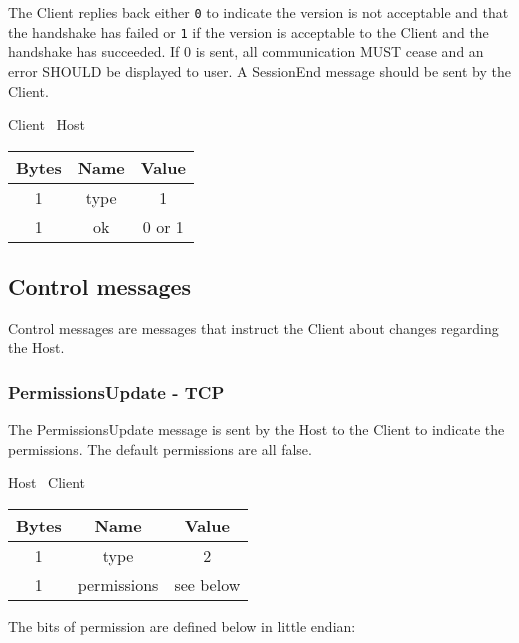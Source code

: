 The Client replies back either \texttt{0} to indicate the version is not acceptable and that the handshake has
failed or \texttt{1} if the version is acceptable to the Client and the handshake has succeeded.
If 0 is sent, all communication MUST cease and an error SHOULD be displayed to user.
A SessionEnd message should be sent by the Client.

\begin{center}
    Client \textrightarrow\ Host\\
    \begin{tabular}{|c|c|c|}
        \hline
        \textbf{Bytes} & \textbf{Name} & \textbf{Value} \\
        \hline
        1              & type          & 1              \\
        \hline
        1              & ok            & 0 or 1         \\
        \hline
    \end{tabular}
\end{center}

\subsection{Control messages}
Control messages are messages that instruct the Client about changes regarding the Host.

\subsubsection{PermissionsUpdate - TCP}

The PermissionsUpdate message is sent by the Host to the Client to indicate the permissions.
The default permissions are all false.

\begin{center}
    Host \textrightarrow\ Client\\
    \begin{tabular}{|c|c|c|}
        \hline
        \textbf{Bytes} & \textbf{Name} & \textbf{Value} \\
        \hline
        1              & type          & 2              \\
        \hline
        1              & permissions   & see below      \\
        \hline
    \end{tabular}
\end{center}

The bits of permission are defined below in little endian:

